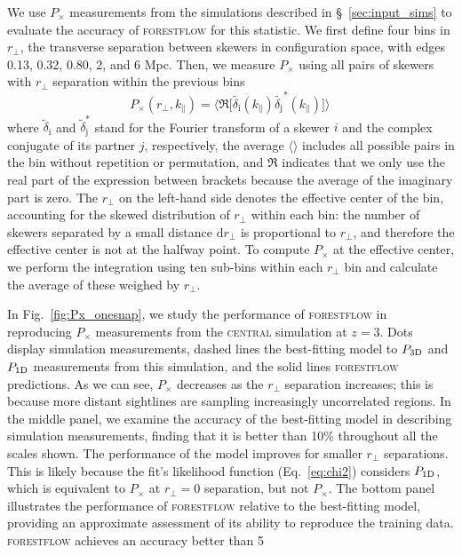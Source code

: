 \documentclass[longauth]{aa}
\newcommand{\pcross}{$P_{\times}$\xspace}
\newcommand{\poned}{\ensuremath{P_{\rm 1D}}\xspace}
\newcommand{\pthreed}{\ensuremath{P_{\rm 3D}}\xspace}
\newcommand{\forestflow}{\textsc{forestflow}\xspace}
\newcommand{\simcentral}{\textsc{central}\xspace}
\begin{document}
We use \pcross measurements from the simulations described in \S~\ref{sec:input_sims} to evaluate the accuracy of \forestflow for this statistic. We first define four bins in $r_\perp$, the transverse separation between skewers in configuration space, with edges 0.13, 0.32, 0.80, 2, and 6 Mpc. Then, we measure \pcross using all pairs of skewers with $r_\perp$ separation within the previous bins 
%
\begin{equation}
    P_\times(r_\perp, k_\parallel) = \bigg \langle \Re \Big[\tilde{\delta_\mathrm{i}}(k_\parallel) \tilde{\delta_\mathrm{j}}^*(k_\parallel)\Big]\bigg\rangle \,
\end{equation}
%
where $\tilde{\delta}_\mathrm{i}$ and $\tilde{\delta}^*_\mathrm{j}$ stand for the Fourier transform of a skewer $i$ and the complex conjugate of its partner $j$, respectively, the average $\langle\rangle$ includes all possible pairs in the bin without repetition or permutation, and $\Re$ indicates that we only use the real part of the expression between brackets because the average of the imaginary part is zero. The $r_\perp$ on the left-hand side denotes the effective center of the bin, accounting for the skewed distribution of $r_\perp$ within each bin: the number of skewers separated by a small distance $\mathrm{d}r_\perp$ is proportional to $r_\perp$, and therefore the effective center is not at the halfway point. To compute \pcross at the effective center, we perform the integration using ten sub-bins within each $r_\perp$ bin and calculate the average of these weighed by $r_\perp$.
    
In Fig.~\ref{fig:Px_onesnap}, we study the performance of \forestflow in reproducing \pcross measurements from the \simcentral simulation at $z=3$. Dots display simulation measurements, dashed lines the best-fitting model to \pthreed and \poned measurements from this simulation, and the solid lines \forestflow predictions. As we can see, \pcross decreases as the $r_\perp$ separation increases; this is because more distant sightlines are sampling increasingly uncorrelated regions. In the middle panel, we examine the accuracy of the best-fitting model in describing simulation measurements, finding that it is better than 10\% throughout all the scales shown. The performance of the model improves for smaller $r_\perp$ separations. This is likely because the fit's likelihood function (Eq.~\ref{eq:chi2}) considers \poned, which is equivalent to \pcross at $r_\perp=0$ separation, but not \pcross. The bottom panel illustrates the performance of \forestflow relative to the best-fitting model, providing an approximate assessment of its ability to reproduce the training data. \forestflow achieves an accuracy better than 5%
\end{document}
